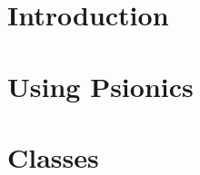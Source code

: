 



\frontmatter
\maketitle
\tableofcontents

\mainmatter%

\chapter{Introduction}

\chapter{Using Psionics}

\chapter{Classes}

